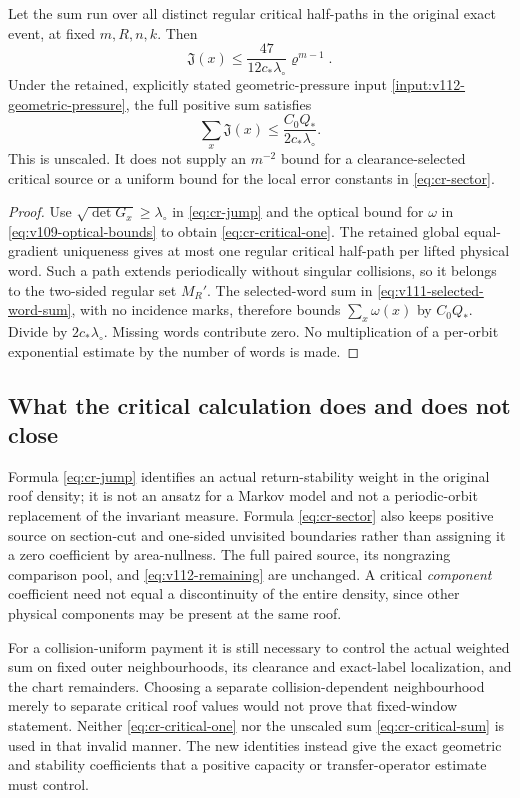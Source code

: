 \begin{proposition}
\label{prop:cr-critical-sum}
Let the sum run over all distinct regular critical half-paths in
the original exact event, at fixed $m,R,n,k$. Then
\begin{equation}\label{eq:cr-critical-one}
 \mathfrak J(x)\le
     \frac{47}{12c_*\lambda_\circ}\varrho^{m-1}.
\end{equation}
Under the retained, explicitly stated geometric-pressure input
\ref{input:v112-geometric-pressure}, the full positive sum satisfies
\begin{equation}\label{eq:cr-critical-sum}
 \sum_x\mathfrak J(x)
          \le\frac{C_0Q_*}{2c_*\lambda_\circ}.
\end{equation}
This is unscaled. It does not supply an $m^{-2}$ bound for a
clearance-selected critical source or a uniform bound for the local
error constants in \eqref{eq:cr-sector}.
\end{proposition}
\begin{proof}
Use $\sqrt{\det G_x}\ge\lambda_\circ$ in
\eqref{eq:cr-jump} and the optical bound for $\omega$ in
\eqref{eq:v109-optical-bounds} to obtain
\eqref{eq:cr-critical-one}. The retained global equal-gradient
uniqueness gives at most one regular critical half-path per lifted
physical word. Such a path extends periodically without singular
collisions, so it belongs to the two-sided regular set $M_R'$.
The selected-word sum in \eqref{eq:v111-selected-word-sum}, with
no incidence marks, therefore bounds $\sum_x\omega(x)$ by
$C_0Q_*$. Divide by $2c_*\lambda_\circ$. Missing words contribute
zero. No multiplication of a per-orbit exponential estimate by the
number of words is made.
\end{proof}

\subsection{What the critical calculation does and does not close}
Formula \eqref{eq:cr-jump} identifies an actual return-stability
weight in the original roof density; it is not an ansatz for a
Markov model and not a periodic-orbit replacement of the invariant
measure. Formula \eqref{eq:cr-sector} also keeps positive source on
section-cut and one-sided unvisited boundaries rather than assigning
it a zero coefficient by area-nullness. The full paired source,
its nongrazing comparison pool, and \eqref{eq:v112-remaining} are
unchanged. A critical \emph{component} coefficient need not equal
a discontinuity of the entire density, since other physical
components may be present at the same roof.

For a collision-uniform payment it is still necessary to control
the actual weighted sum on fixed outer neighbourhoods, its
clearance and exact-label localization, and the chart remainders.
Choosing a separate collision-dependent neighbourhood merely to
separate critical roof values would not prove that fixed-window
statement. Neither \eqref{eq:cr-critical-one} nor the unscaled
sum \eqref{eq:cr-critical-sum} is used in that invalid manner.
The new identities instead give the exact geometric and stability
coefficients that a positive capacity or transfer-operator estimate
must control.
